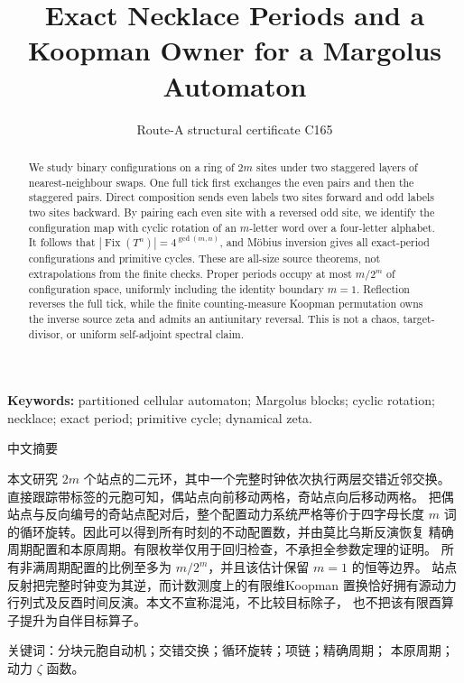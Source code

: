 \documentclass[10pt]{article}
\title{Exact Necklace Periods and a Koopman Owner for a Margolus Automaton}
\author{Route-A structural certificate C165}
\date{}
\begin{document}
\maketitle
\begin{abstract}
We study binary configurations on a ring of $2m$ sites under two staggered
layers of nearest-neighbour swaps.  One full tick first exchanges the even
pairs and then the staggered pairs.  Direct composition sends even labels two
sites forward and odd labels two sites backward.  By pairing each even site
with a reversed odd site, we identify the configuration map with cyclic
rotation of an $m$-letter word over a four-letter alphabet.  It follows that
$|\operatorname{Fix}(T^n)|=4^{\gcd(m,n)}$, and M\"obius inversion gives all
exact-period configurations and primitive cycles.  These are all-size source
theorems, not extrapolations from the finite checks.  Proper periods occupy
at most $m/2^m$ of configuration space, uniformly including the identity
boundary $m=1$.  Reflection reverses the full tick, while the finite
counting-measure Koopman permutation owns the inverse source zeta and admits
an antiunitary reversal.  This is not a chaos, target-divisor, or
uniform self-adjoint spectral claim.
\end{abstract}
\noindent\textbf{Keywords:} partitioned cellular automaton; Margolus blocks;
cyclic rotation; necklace; exact period; primitive cycle; dynamical zeta.

\begin{otherlanguage}{chinese-simplified}
\begin{center}{\large 中文摘要}\end{center}
\begin{sloppypar}
本文研究 $2m$ 个站点的二元环，其中一个完整时钟依次执行两层交错近邻交换。
直接跟踪带标签的元胞可知，偶站点向前移动两格，奇站点向后移动两格。
把偶站点与反向编号的奇站点配对后，整个配置动力系统严格等价于四字母长度
$m$ 词的循环旋转。因此可以得到所有时刻的不动配置数，并由莫比乌斯反演恢复
精确周期配置和本原周期。有限枚举仅用于回归检查，不承担全参数定理的证明。
所有非满周期配置的比例至多为 $m/2^m$，并且该估计保留 $m=1$ 的恒等边界。
站点反射把完整时钟变为其逆，而计数测度上的有限维\foreignlanguage{english}{Koopman}
置换恰好拥有源动力行列式及反酉时间反演。本文不宣称混沌，不比较目标除子，
也不把该有限酉算子提升为自伴目标算子。
\end{sloppypar}
\noindent 关键词：分块元胞自动机；交错交换；循环旋转；项链；精确周期；
本原周期；动力 $\zeta$ 函数。
\end{otherlanguage}
\end{document}
